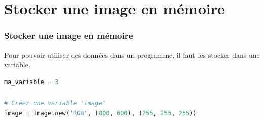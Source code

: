 \documentclass[svgnames,11pt]{beamer}
\begin{document}
\section{Stocker une image en mémoire}
\begin{frame}[fragile]
    \frametitle{Stocker une image en mémoire}

Pour pouvoir utiliser des données dans un programme, il faut les stocker dans une variable.
\begin{center}
\end{center}

\begin{center}
    \begin{lstlisting}[language=Python , basicstyle=\ttfamily\small, xleftmargin=2em, xrightmargin=2em]
ma_variable = 3
\end{lstlisting}
    \label{CODE}
    \end{center}
\end{frame}
\begin{frame}[fragile]
    \frametitle{}
\begin{center}
\begin{lstlisting}[language=Python , basicstyle=\ttfamily\small, xleftmargin=0em, xrightmargin=0em]
# Créer une variable 'image'
image = Image.new('RGB', (800, 600), (255, 255, 255))
\end{lstlisting}
\label{CODE}
\end{center}

\begin{center}
\end{center}

\end{frame}
\end{document}
